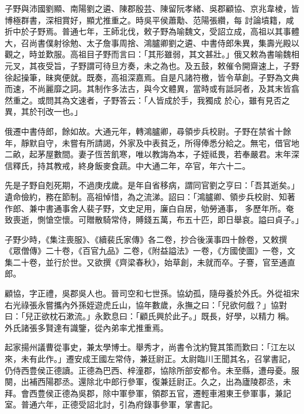 \begin{pinyinscope}
 子野與沛國劉顯、南陽劉之遴、陳郡殷芸、陳留阮孝緒、吳郡顧協、京兆韋棱，皆博極群書，深相賞好，顯尤推重之。時吳平侯蕭勱、范陽張纘，每
 討論墳籍，咸折中於子野焉。普通七年，王師北伐，敕子野為喻魏文，受詔立成，高祖以其事體大，召尚書僕射徐勉、太子詹事周捨、鴻臚卿劉之遴、中書侍郎朱異，集壽光殿以觀之，時並歎服。高祖目子野而言曰：「其形雖弱，其文甚壯。」俄又敕為書喻魏相元叉，其夜受旨，子野謂可待旦方奏，未之為也。及五鼓，敕催令開齋速上，子野徐起操筆，昧爽便就。既奏，高祖深嘉焉。自是凡諸符檄，皆令草創。子野為文典而速，不尚麗靡之詞。其制作多法古，與今文體異，當時或有詆訶者，及其末皆翕然重之。或問其為文速者，子野答云：「人皆成於手，我獨成
 於心，雖有見否之異，其於刊改一也。」



 俄遷中書侍郎，餘如故。大通元年，轉鴻臚卿，尋領步兵校尉。子野在禁省十餘年，靜默自守，未嘗有所請謁，外家及中表貧乏，所得俸悉分給之。無宅，借官地二畝，起茅屋數間。妻子恆苦飢寒，唯以教誨為本，子姪祗畏，若奉嚴君。末年深信釋氏，持其教戒，終身飯麥食蔬。中大通二年，卒官，年六十二。



 先是子野自剋死期，不過庚戌歲。是年自省移病，謂同官劉之亨曰：「吾其逝矣。」遺命儉約，務在節制。高祖悼惜，為之流涕。詔曰：「鴻臚卿、領步兵校尉、知著作郎、兼中書通事舍人裴子野，文史足用，廉白自居，劬勞通事，
 多歷年所。奄致喪逝，惻愴空懷。可贈散騎常侍，賻錢五萬，布五十匹，即日舉哀。謚曰貞子。」



 子野少時，《集注喪服》、《續裴氏家傳》各二卷，抄合後漢事四十餘卷，又敕撰《眾僧傳》二十卷，《百官九品》二卷，《附益謚法》一卷，《方國使圖》一卷，文集二十卷，並行於世。又欲撰《齊梁春秋》，始草創，未就而卒。子謇，官至通直郎。



 顧協，字正禮，吳郡吳人也。晉司空和七世孫。協幼孤，隨母養於外氏。外從祖宋右光祿張永嘗攜內外孫姪遊虎丘山，協年數歲，永撫之曰：「兒欲何戲？」協對曰：「兒正欲枕石漱流。」永歎息曰：「顧氏興於此子。」既長，好學，以精力
 稱。外氏諸張多賢達有識鑒，從內弟率尤推重焉。



 起家揚州議曹從事史，兼太學博士。舉秀才，尚書令沈約覽其策而歎曰：「江左以來，未有此作。」遷安成王國左常侍，兼廷尉正。太尉臨川王聞其名，召掌書記，仍侍西豊侯正德讀。正德為巴西、梓潼郡，協除所部安都令。未至縣，遭母憂。服闋，出補西陽郡丞。還除北中郎行參軍，復兼廷尉正。久之，出為廬陵郡丞，未拜。會西豊侯正德為吳郡，除中軍參軍，領郡五官，遷輕車湘東王參軍事，兼記室。普通六年，正德受詔北討，引為府錄事參軍，掌書記。




\end{pinyinscope}
